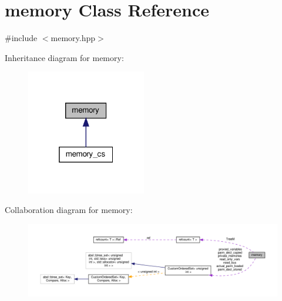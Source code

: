 \hypertarget{classmemory}{}\section{memory Class Reference}
\label{classmemory}


{\ttfamily \#include $<$memory.\+hpp$>$}



Inheritance diagram for memory\+:
\nopagebreak
\begin{figure}[H]
\begin{center}
\leavevmode
\includegraphics[width=148pt]{de/d09/classmemory__inherit__graph}
\end{center}
\end{figure}


Collaboration diagram for memory\+:
\nopagebreak
\begin{figure}[H]
\begin{center}
\leavevmode
\includegraphics[width=350pt]{d8/df5/classmemory__coll__graph}
\end{center}
\end{figure}
